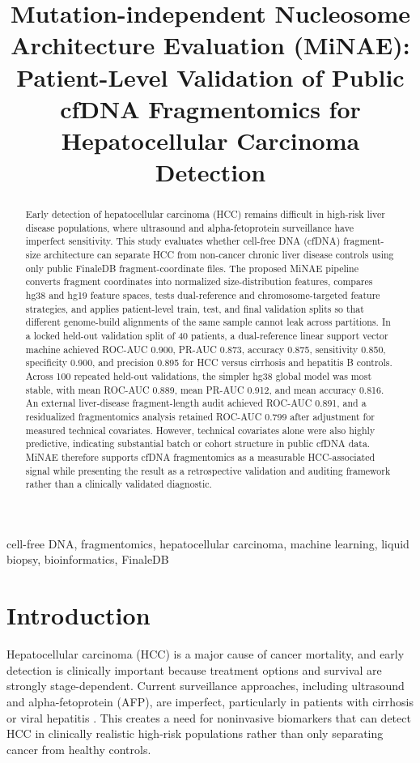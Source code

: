 \documentclass[conference]{IEEEtran}
\title{Mutation-independent Nucleosome Architecture Evaluation (MiNAE): Patient-Level Validation of Public cfDNA Fragmentomics for Hepatocellular Carcinoma Detection}
\author{}
\begin{document}
\maketitle

\begin{abstract}
Early detection of hepatocellular carcinoma (HCC) remains difficult in high-risk liver disease populations, where ultrasound and alpha-fetoprotein surveillance have imperfect sensitivity. This study evaluates whether cell-free DNA (cfDNA) fragment-size architecture can separate HCC from non-cancer chronic liver disease controls using only public FinaleDB fragment-coordinate files. The proposed MiNAE pipeline converts fragment coordinates into normalized size-distribution features, compares hg38 and hg19 feature spaces, tests dual-reference and chromosome-targeted feature strategies, and applies patient-level train, test, and final validation splits so that different genome-build alignments of the same sample cannot leak across partitions. In a locked held-out validation split of 40 patients, a dual-reference linear support vector machine achieved ROC-AUC 0.900, PR-AUC 0.873, accuracy 0.875, sensitivity 0.850, specificity 0.900, and precision 0.895 for HCC versus cirrhosis and hepatitis B controls. Across 100 repeated held-out validations, the simpler hg38 global model was most stable, with mean ROC-AUC 0.889, mean PR-AUC 0.912, and mean accuracy 0.816. An external liver-disease fragment-length audit achieved ROC-AUC 0.891, and a residualized fragmentomics analysis retained ROC-AUC 0.799 after adjustment for measured technical covariates. However, technical covariates alone were also highly predictive, indicating substantial batch or cohort structure in public cfDNA data. MiNAE therefore supports cfDNA fragmentomics as a measurable HCC-associated signal while presenting the result as a retrospective validation and auditing framework rather than a clinically validated diagnostic.
\end{abstract}

\begin{IEEEkeywords}
cell-free DNA, fragmentomics, hepatocellular carcinoma, machine learning, liquid biopsy, bioinformatics, FinaleDB
\end{IEEEkeywords}

\section{Introduction}
Hepatocellular carcinoma (HCC) is a major cause of cancer mortality, and early detection is clinically important because treatment options and survival are strongly stage-dependent. Current surveillance approaches, including ultrasound and alpha-fetoprotein (AFP), are imperfect, particularly in patients with cirrhosis or viral hepatitis \cite{tzartzeva2018surveillance}. This creates a need for noninvasive biomarkers that can detect HCC in clinically realistic high-risk populations rather than only separating cancer from healthy controls.
\end{document}
